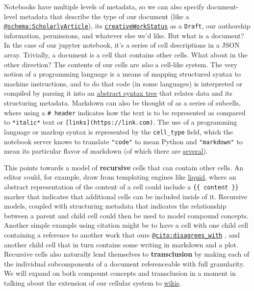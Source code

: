 Notebooks have multiple levels of metadata, so we can also specify
document-level metadata that describe the type of our document (like a
\href{https://schema.org/ScholarlyArticle}{\texttt{@schema:ScholarlyArticle}}),
its
\href{https://schema.org/creativeWorkStatus}{\texttt{creativeWorkStatus}}
as a \texttt{Draft}, our authorship information, permissions, and
whatever else we'd like. But what is a document? In the case of our
jupyter notebook, it's a series of cell descriptions in a JSON array.
Trivially, a document is a cell that contains other cells. What about in
the other direction? The contents of our cells are \emph{also} a
cell-like system. The very notion of a programming language is a means
of mapping structured syntax to machine instructions, and to do that
code (in some languages) is interpreted or compiled by parsing it into
an \href{https://en.wikipedia.org/wiki/Abstract_syntax_tree}{abstract
syntax tree} that relates data and its structuring metadata. Markdown
can also be thought of as a series of subcells, where using a
\texttt{\#\ header} indicates how the text is to be represented as
compared to \texttt{*italic*} text or
\texttt{{[}links{]}(https://link.com)}. The use of a programming
language or markup syntax is represented by the \texttt{cell\_type}
field, which the notebook server knows to translate \texttt{"code"} to
mean Python and \texttt{"markdown"} to mean its particular flavor of
markdown (of which there are
\href{https://www.iana.org/assignments/markdown-variants/markdown-variants.xhtml}{several}).

This points towards a model of \textbf{recursive} cells that can contain
other cells. An editor could, for example, draw from templating engines
like \href{https://shopify.github.io/liquid/}{liquid}, where an abstract
representation of the content of a cell could include a
\texttt{\{\{\ content\ \}\}} marker that indicates that additional cells
can be included inside of it. Recursive models, coupled with structuring
metadata that indicates the relationship between a parent and child cell
could then be used to model compound concepts. Another simple example
using citation might be to have a cell with one child cell containing a
reference to another work that ours
\href{https://sparontologies.github.io/cito/current/cito.html\#d4e449}{\texttt{@cito:disagrees\_with}}
\citep{peroniFaBiOCiTOOntologies2012} , and another child cell
that in turn contains some writing in markdown and a plot. Recursive
cells also naturally lend themselves to \textbf{transclusion} by making
each of the individual subcomponents of a document referenceable with
full granularity. We will expand on both compount concepts and
transclusion in a moment in talking about the extension of our cellular
system to \protect\hyperlink{trackers-clients--wikis}{wikis}.

